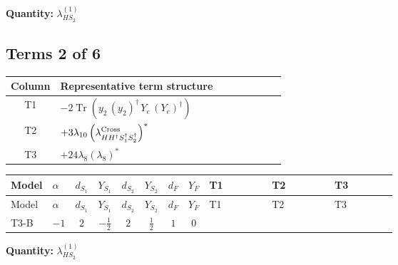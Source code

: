 \documentclass[8pt]{article}
\begin{document}
\begin{landscape}
\begin{longtable}{@{}llcccccc >{\raggedright\arraybackslash}p{0.21\linewidth} >{\raggedright\arraybackslash}p{0.21\linewidth} >{\raggedright\arraybackslash}p{0.21\linewidth}@{}}
\midrule
\bottomrule
\end{longtable}
\clearpage
\noindent\textbf{Quantity: }$\lambda_{HS_2}^{(1)}$\par\smallskip
\subsection*{Terms 2 of 6}
\begin{center}
\begin{tabular}{@{}c >{\raggedright\arraybackslash}p{0.82\linewidth}@{}}
\toprule
Column & Representative term structure \\
\midrule
T1 & \(\displaystyle -2 \operatorname{Tr}\!\left({y_2}\,\left({y_2}\right)^{\dagger}\,{Y_e}\,\left({Y_e}\right)^{\dagger}\right)\) \\
\midrule
T2 & \(\displaystyle +3 {\lambda_{10}} \left({\lambda_{H H^\dagger S_1^\dagger S_2^\dagger}^{\rm Cross}}\right)^{*}\) \\
\midrule
T3 & \(\displaystyle +24 {\lambda_{8}} \left({\lambda_{8}}\right)^{*}\) \\
\midrule
\bottomrule
\end{tabular}
\end{center}
\smallskip
\tiny
\begin{longtable}{@{}llcccccc >{\raggedright\arraybackslash}p{0.21\linewidth} >{\raggedright\arraybackslash}p{0.21\linewidth} >{\raggedright\arraybackslash}p{0.21\linewidth}@{}}
\toprule
Model & $\alpha$ & $d_{S_1}$ & $Y_{S_1}$ & $d_{S_2}$ & $Y_{S_2}$ & $d_F$ & $Y_F$ & T1 & T2 & T3 \\
\midrule
\endfirsthead
\toprule
Model & $\alpha$ & $d_{S_1}$ & $Y_{S_1}$ & $d_{S_2}$ & $Y_{S_2}$ & $d_F$ & $Y_F$ & T1 & T2 & T3 \\
\midrule
\endhead
T3-B & $-1$ & $2$ & $-\frac{1}{2}$ & $2$ & $\frac{1}{2}$ & $1$ & $0$ & \scriptsize\adjustbox{max width=\linewidth}{$\begin{gathered} -2 \operatorname{Tr}\!\left({y_2}\,\left({y_2}\right)^{\dagger}\,{Y_e}\,\left({Y_e}\right)^{\dagger}\right)\end{gathered}$} & \scriptsize\adjustbox{max width=\linewidth}{$\begin{gathered} +3 {\lambda_{10}} \left({\lambda_{H H^\dagger S_1^\dagger S_2^\dagger}^{\rm Cross}}\right)^{*}\end{gathered}$} & \scriptsize\adjustbox{max width=\linewidth}{$\begin{gathered} +24 {\lambda_{8}} \left({\lambda_{8}}\right)^{*}\end{gathered}$} \\
\midrule
\bottomrule
\end{longtable}
\clearpage
\noindent\textbf{Quantity: }$\lambda_{HS_2}^{(1)}$\par\smallskip

\end{landscape}
\end{document}

